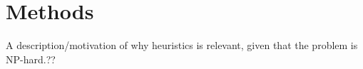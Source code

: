 \chapter{Methods}
A description/motivation of why heuristics is relevant, given that the problem is NP-hard.??






